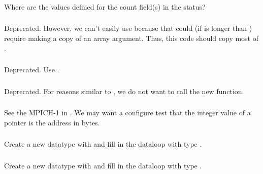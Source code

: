 \documentclass{article}
\begin{document}
\subsubsection{}
Where are the values defined for the count field(s) in the status?

\subsubsection{}
Deprecated.  However, we can't easily use 
because that could (if  is longer than ) require
making a copy of an array argument.  Thus, this code should copy most
of .

\subsubsection{}
Deprecated.  Use .

\subsubsection{}
Deprecated.  For reasons similar to , we do
not want to call the new function.

\subsubsection{}
See the MPICH-1  in .
We may want a configure test that the integer value of a  pointer
is the address in bytes.

\subsubsection{}
Create a new datatype with  and fill in the dataloop
with type .  

\subsubsection{}
Create a new datatype with  and fill in the dataloop
with type .
\end{document}
